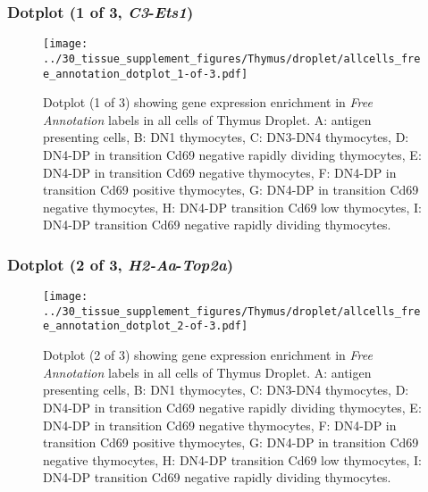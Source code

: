 \clearpage

\subsubsection{Dotplot (1 of 3, \emph{C3}-\emph{Ets1})}
\begin{figure}[h]
\centering
\texttt{[image: ../30\_tissue\_supplement\_figures/Thymus/droplet/allcells\_free\_annotation\_dotplot\_1-of-3.pdf]}

\caption{ Dotplot (1 of 3)  showing gene expression enrichment in \emph{Free Annotation} labels in all cells of Thymus Droplet. A: antigen presenting cells, B: DN1 thymocytes, C: DN3-DN4 thymocytes, D: DN4-DP in transition Cd69 negative rapidly dividing thymocytes, E: DN4-DP in transition Cd69 negative thymocytes, F: DN4-DP in transition Cd69 positive thymocytes, G: DN4-DP in transition Cd69 negative thymocytes, H: DN4-DP transition Cd69 low thymocytes, I: DN4-DP transition Cd69 negative rapidly dividing thymocytes.}
\end{figure}


\clearpage

\subsubsection{Dotplot (2 of 3, \emph{H2-Aa}-\emph{Top2a})}
\begin{figure}[h]
\centering
\texttt{[image: ../30\_tissue\_supplement\_figures/Thymus/droplet/allcells\_free\_annotation\_dotplot\_2-of-3.pdf]}

\caption{ Dotplot (2 of 3)  showing gene expression enrichment in \emph{Free Annotation} labels in all cells of Thymus Droplet. A: antigen presenting cells, B: DN1 thymocytes, C: DN3-DN4 thymocytes, D: DN4-DP in transition Cd69 negative rapidly dividing thymocytes, E: DN4-DP in transition Cd69 negative thymocytes, F: DN4-DP in transition Cd69 positive thymocytes, G: DN4-DP in transition Cd69 negative thymocytes, H: DN4-DP transition Cd69 low thymocytes, I: DN4-DP transition Cd69 negative rapidly dividing thymocytes.}
\end{figure}


\clearpage

